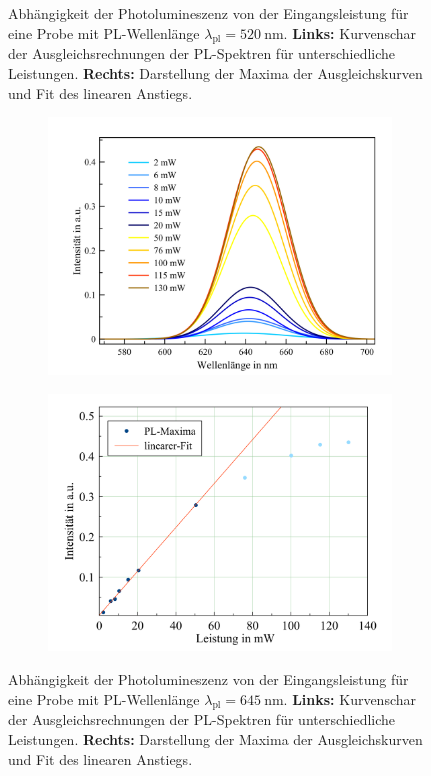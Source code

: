 \begin{figure}[H]
\begin{subfigure}{0.45\textwidth}
  \end{subfigure}
  \caption{Abhängigkeit der Photolumineszenz von der Eingangsleistung für eine Probe mit PL-Wellenlänge $\lambda_{\text{pl}} = \SI{520}{\nano\meter}$.
  \textbf{Links:} Kurvenschar der Ausgleichsrechnungen der PL-Spektren für unterschiedliche Leistungen. \textbf{Rechts:} Darstellung der Maxima der Ausgleichskurven und Fit des linearen Anstiegs.}
  \label{fig:Podep520}
\end{figure}
\begin{figure}[H]
  \centering
  \begin{subfigure}{0.49\textwidth}
    \includegraphics[width=\textwidth]{plots/Powerdependence_645nm.png}
  \end{subfigure}
  \begin{subfigure}{0.46\textwidth}
    \includegraphics[width=\textwidth]{plots/Powerdepfit_645.png}
  \end{subfigure}
  \caption{Abhängigkeit der Photolumineszenz von der Eingangsleistung für eine Probe mit PL-Wellenlänge $\lambda_{\text{pl}} = \SI{645}{\nano\meter}$. \textbf{Links:} Kurvenschar der Ausgleichsrechnungen der PL-Spektren für unterschiedliche Leistungen. \textbf{Rechts:} Darstellung der Maxima der Ausgleichskurven und Fit des linearen Anstiegs.}
  \label{fig:Podep645}
\end{figure}

